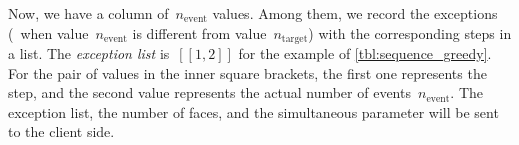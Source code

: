 \documentclass[twocolumn]{svjour3}          %
\begin{document}

Now, we have a column of~$n_\mathrm{event}$ values.
Among them, we record the exceptions 
(\ie~when value~$n_\mathrm{event}$ 
is different from value~$n_\mathrm{target}$) 
with the corresponding steps in a list.
The \emph{exception list} is~$[[1, 2]]$ for the example of \tabl\ref{tbl:sequence_greedy}.
For the pair of values in the inner square brackets,
the first one represents the step,
and the second value represents 
the actual number of events~$n_\mathrm{event}$.
The exception list, the number of faces, and the simultaneous parameter 
will be sent to the client side.
 
\end{document}
